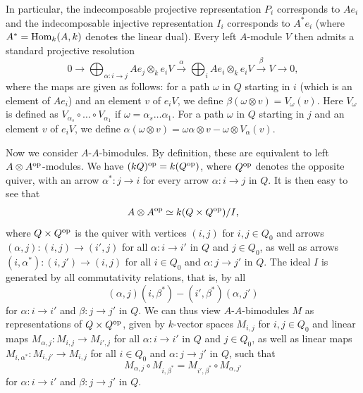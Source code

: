 \documentclass[12pt,a4paper]{amsart}
\numberwithin{equation}{section}
\theoremstyle{remark}
\begin{document}
In particular, the indecomposable projective representation $P_i$ corresponds to $Ae_i$ and the 
indecomposable injective representation $I_i$ corresponds to $A^*e_i$ 
(where $A^*={\rm Hom}_k(A,k)$ denotes the linear dual). Every left $A$-module $V$ then 
admits a standard projective resolution
$$0\rightarrow\bigoplus_{\alpha:i\rightarrow j}Ae_j\otimes_ke_iV\stackrel{\alpha}{\rightarrow}\bigoplus_iAe_i\otimes_ke_iV\stackrel{\beta}{\rightarrow} V\rightarrow 0,$$
where the maps are given as follows: for a path $\omega$ in $Q$ starting in $i$ (which is an element 
of $Ae_i$) and an element $v$ of $e_iV$, we define $\beta(\omega\otimes v)=V_\omega(v)$. 
Here $V_\omega$ is defined as $V_{\alpha_s}\circ\ldots\circ V_{\alpha_1}$ if 
$\omega=\alpha_s\ldots\alpha_1$. For a path $\omega$ in $Q$ starting in $j$ and an element 
$v$ of $e_iV$, we define $\alpha(\omega\otimes v)=\omega\alpha\otimes v-\omega\otimes V_\alpha(v)$.

Now we consider $A$-$A$-bimodules. By definition, these are equivalent to left 
$A\otimes A^{\rm op}$-modules. We have $(kQ)^{\rm op}=k(Q^{\rm op})$, where $Q^{\rm op}$ denotes 
the opposite quiver, with an arrow $\alpha^*:j\rightarrow i$ for every arrow $\alpha:i\rightarrow j$ 
in $Q$. It is then easy to see that 
\begin{equation}\label{eq:ideal}A\otimes A^{\rm op}\simeq k(Q\times Q^{\rm op})/I,
\end{equation}
where $Q\times Q^{\rm op}$ is the quiver with vertices $(i,j)$ for $i,j\in Q_0$ and arrows 
$(\alpha,j):(i,j)\rightarrow (i',j)$ for all $\alpha:i\rightarrow i'$ in $Q$ and $j\in Q_0$, 
as well as arrows $(i,\alpha^*):(i,j')\rightarrow (i,j)$ for all 
$i\in Q_0$ and $\alpha:j\rightarrow j'$ in $Q$. The ideal $I$ is generated by all commutativity
relations, that is, by all  $$(\alpha,j)(i,\beta^*)-(i',\beta^*)(\alpha,j')$$
for $\alpha:i\rightarrow i'$ and $\beta:j\rightarrow j'$ in $Q$. We can thus view $A$-$A$-bimodules 
$M$ as representations of $Q\times Q^{\rm op}$, given by $k$-vector spaces $M_{i,j}$ for 
$i,j\in Q_0$ and linear maps $M_{\alpha,j}:M_{i,j}\rightarrow M_{i',j}$ for all 
$\alpha:i\rightarrow i'$ in $Q$ and $j\in Q_0$, as well as linear maps 
$M_{i,\alpha^*}:M_{i,j'}\rightarrow M_{i,j}$ for all $i\in Q_0$ and $\alpha:j\rightarrow j'$ in $Q$, such that
$$M_{\alpha,j}\circ M_{i,\beta^*}=M_{i',\beta^*}\circ M_{\alpha,j'}$$
for $\alpha:i\rightarrow i'$ and $\beta:j\rightarrow j'$ in $Q$.

\end{document}
